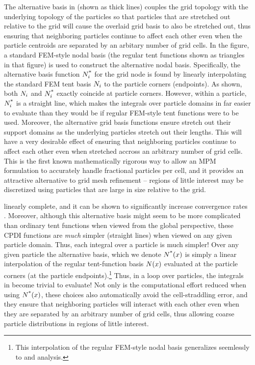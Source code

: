 The alternative basis in  (shown as thick lines) couples the grid topology with the underlying topology of the particles so that particles that are stretched out relative to the grid will cause the overlaid grid basis to also be stretched out, thus ensuring that neighboring particles continue to affect each other even when the particle centroids are separated by an arbitary number of grid cells. In the figure, a standard FEM-style nodal basis (\eg the regular tent functions shown as triangles in that figure) is used to construct the alternative nodal basis.  Specifically, the alternative basis function ${N}_i^{\text{*}}$ for the \ith grid node is found by linearly interpolating the standard FEM tent basis ${N}_i$ to the particle corners (endpoints). As shown, both ${N}_i$ and ${N}_i^{\text{*}}$ exactly coincide at particle corners.  However, within a particle, ${N}_i^{\text{*}}$ is a straight line, which makes the integrals over particle domains in  far easier to evaluate than they would be if regular FEM-style tent functions were to be used. Moreover, the alternative grid basis functions ensure stretch out their support domains as the underlying particles stretch out their lengths. This will have a very desirable effect of ensuring that neighboring particles continue to affect each other even when stretched accross an arbitrary number of grid cells. This is the first known mathematically rigorous way to allow an MPM formulation to accurately handle fractional particles per cell, and it provides an attractive alternative to grid mesh refinement -- regions of little interest may be discretized using particles that are large in size relative to the grid.


linearly complete, and it can be shown to significantly increase convergence rates \cite{Sadeghirad2011}.  Moreover, although this alternative basis might seem to be more complicated than ordinary tent functions when viewed from the global perspective, these CPDI functions are \emph{much} simpler (straight lines) when viewed on any given particle domain. Thus, each integral over a particle is much simpler!  Over any given particle the alternative basis, which we denote ${N}^{\text{*}}(x)$ is simply a linear interpolation of the regular tent-function basis ${N}(x)$ evaluated at the particle corners (\ie at the particle endpoints).\footnote{This interpolation of the regular FEM-style nodal basis generalizes seemlessly to \twoD and \threeD analysis.}  Thus, in a loop over particles, the integrals in  become trivial to evaluate!  Not only is the computational effort reduced when using ${N}^{\text{*}}(x)$, these choices also automatically avoid the cell-straddling error, and they ensure that neighboring particles will interact with each other even when they are separated by an arbitrary number of grid cells, thus allowing coarse particle distributions in regions of little interest.

